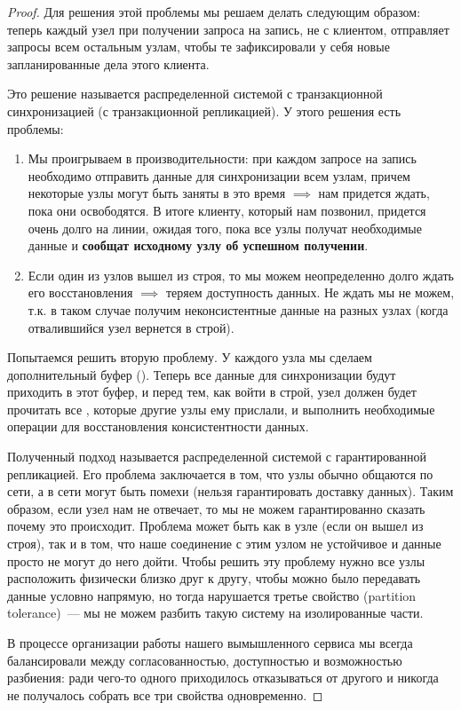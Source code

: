 \begin{proof}
  Для решения этой проблемы мы решаем делать следующим образом: теперь каждый
  узел при получении запроса на запись, не  с клиентом,
  отправляет запросы всем остальным узлам, чтобы те зафиксировали у себя новые
  запланированные дела этого клиента.

  Это решение называется распределенной системой с транзакционной синхронизацией
  (с транзакционной репликацией). У этого решения есть проблемы:

  \begin{enumerate}
  \item
    Мы проигрываем в производительности: при каждом запросе на запись необходимо
    отправить данные для синхронизации всем узлам, причем некоторые узлы могут
    быть заняты в это время \(\implies\) нам придется ждать, пока они
    освободятся. В итоге клиенту, который нам позвонил, придется очень долго
     на линии, ожидая того, пока все узлы получат необходимые
    данные и \textbf{сообщат исходному узлу об успешном получении}.

  \item
    Если один из узлов вышел из строя, то мы можем неопределенно долго ждать его
    восстановления \(\implies\) теряем доступность данных. Не ждать мы не можем,
    т.к. в таком случае получим неконсистентные данные на разных узлах (когда
    отвалившийся узел вернется в строй).
  \end{enumerate}

  Попытаемся решить вторую проблему. У каждого узла мы сделаем дополнительный
  буфер (). Теперь все данные для синхронизации будут
  приходить в этот буфер, и перед тем, как войти в строй, узел должен будет
  прочитать все , которые другие узлы ему прислали, и
  выполнить необходимые операции для восстановления консистентности данных.

  Полученный подход называется распределенной системой с гарантированной
  репликацией. Его проблема заключается в том, что узлы обычно общаются по сети,
  а в сети могут быть помехи (нельзя гарантировать доставку данных). Таким
  образом, если узел нам не отвечает, то мы не можем гарантированно сказать
  почему это происходит. Проблема может быть как в узле (если он вышел из
  строя), так и в том, что наше соединение с этим узлом не устойчивое и данные
  просто не могут до него дойти. Чтобы решить эту проблему нужно все узлы
  расположить физически близко друг к другу, чтобы можно было передавать данные
  условно напрямую, но тогда нарушается третье свойство (partition
  tolerance)~--- мы не можем разбить такую систему на изолированные части.

  В процессе организации работы нашего вымышленного сервиса мы всегда
  балансировали между согласованностью, доступностью и возможностью разбиения:
  ради чего-то одного приходилось отказываться от другого и никогда не
  получалось собрать все три свойства одновременно.
\end{proof}

